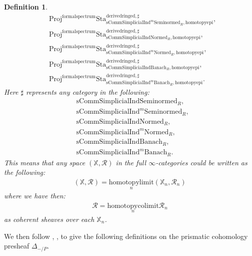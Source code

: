 \documentclass[12pt]{book}
\newtheorem{definition}{Definition}
\begin{document}
\begin{definition}
\begin{align}
&\mathrm{Proj}^\mathrm{formalspectrum}\mathrm{Sta}^\mathrm{derivedringed,\sharp}_{\mathrm{sComm}\mathrm{Simplicial}\mathrm{Ind}^m\mathrm{Seminormed}_R,\mathrm{homotopyepi}},\\
&\mathrm{Proj}^\mathrm{formalspectrum}\mathrm{Sta}^\mathrm{derivedringed,\sharp}_{\mathrm{sComm}\mathrm{Simplicial}\mathrm{Ind}\mathrm{Normed}_R,\mathrm{homotopyepi}},\\
&\mathrm{Proj}^\mathrm{formalspectrum}\mathrm{Sta}^\mathrm{derivedringed,\sharp}_{\mathrm{sComm}\mathrm{Simplicial}\mathrm{Ind}^m\mathrm{Normed}_R,\mathrm{homotopyepi}},\\
&\mathrm{Proj}^\mathrm{formalspectrum}\mathrm{Sta}^\mathrm{derivedringed,\sharp}_{\mathrm{sComm}\mathrm{Simplicial}\mathrm{Ind}\mathrm{Banach}_R,\mathrm{homotopyepi}},\\
&\mathrm{Proj}^\mathrm{formalspectrum}\mathrm{Sta}^\mathrm{derivedringed,\sharp}_{\mathrm{sComm}\mathrm{Simplicial}\mathrm{Ind}^m\mathrm{Banach}_R,\mathrm{homotopyepi}}.	
\end{align}
Here $\sharp$ represents any category in the following:
\begin{align}
&\mathrm{sComm}\mathrm{Simplicial}\mathrm{Ind}\mathrm{Seminormed}_R,\\
&\mathrm{sComm}\mathrm{Simplicial}\mathrm{Ind}^m\mathrm{Seminormed}_R,\\
&\mathrm{sComm}\mathrm{Simplicial}\mathrm{Ind}\mathrm{Normed}_R,\\
&\mathrm{sComm}\mathrm{Simplicial}\mathrm{Ind}^m\mathrm{Normed}_R,\\
&\mathrm{sComm}\mathrm{Simplicial}\mathrm{Ind}\mathrm{Banach}_R,\\
&\mathrm{sComm}\mathrm{Simplicial}\mathrm{Ind}^m\mathrm{Banach}_R.	
\end{align}	
This means that any space $(\mathbb{X},\mathcal{R})$ in the full $\infty$-categories could be written as the following:
\begin{align}
(\mathbb{X},\mathcal{R})=\underset{n}{\mathrm{homotopylimit}}(\mathbb{X}_n,\mathcal{R}_n)	
\end{align}
where we have then:
\begin{align}
\mathcal{R}=\underset{n}{\mathrm{homotopycolimit}}\mathcal{R}_n	
\end{align}
as coherent sheaves over each $\mathbb{X}_n$.

	
\end{definition}




\indent We then follow \cite{BS}, \cite{BL}, \cite{Dr1} to give the following definitions on the prismatic cohomology presheaf $\Delta_{-/P}$.
\end{document}
